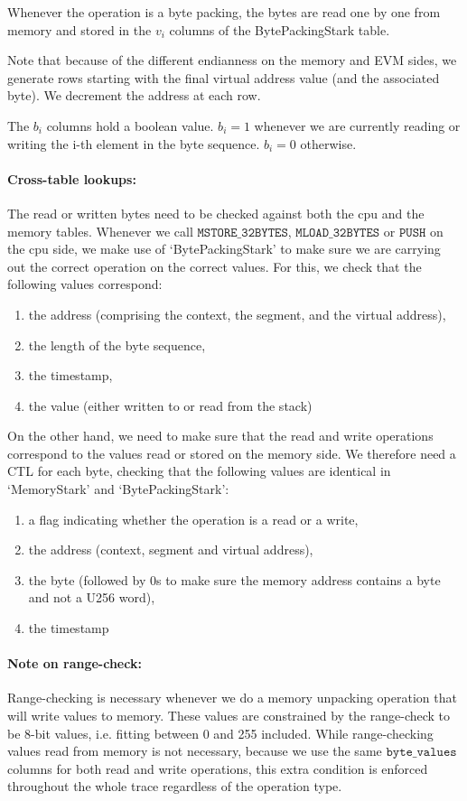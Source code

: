 Whenever the operation is a byte packing, the bytes are read one by one from memory and stored in the $v_i$ columns of the BytePackingStark table.

Note that because of the different endianness on the memory and EVM sides, we generate rows starting with the final virtual address value (and the associated byte). We decrement the address at each row.

The $b_i$ columns hold a boolean value. $b_i = 1$ whenever we are currently reading or writing the i-th element in the byte sequence. $b_i = 0$ otherwise.

\paragraph{Cross-table lookups:}
The read or written bytes need to be checked against both the cpu and the memory tables. Whenever we call $\texttt{MSTORE\_32BYTES}$, $\texttt{MLOAD\_32BYTES}$ or $\texttt{PUSH}$ on the cpu side, we make use of `BytePackingStark' to make sure we are carrying out the correct operation on the correct values. For this, we check that the following values correspond:
\begin{enumerate}
    \item the address (comprising the context, the segment, and the virtual address),
    \item the length of the byte sequence,
    \item the timestamp,
    \item the value (either written to or read from the stack)
\end{enumerate}

On the other hand, we need to make sure that the read and write operations correspond to the values read or stored on the memory side. We therefore need a CTL for each byte, checking that the following values are identical in `MemoryStark' and `BytePackingStark':
\begin{enumerate}
    \item a flag indicating whether the operation is a read or a write,
    \item the address (context, segment and virtual address),
    \item the byte (followed by 0s to make sure the memory address contains a byte and not a U256 word),
    \item the timestamp
\end{enumerate}

\paragraph*{Note on range-check:} Range-checking is necessary whenever we do a memory unpacking operation that will
write values to memory. These values are constrained by the range-check to be 8-bit values, i.e. fitting between 0 and 255 included.
While range-checking values read from memory is not necessary, because we use the same $\texttt{byte\_values}$ columns for both read
and write operations, this extra condition is enforced throughout the whole trace regardless of the operation type.

